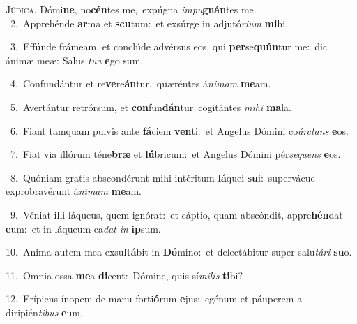 \lettrine{\initial\textcolor{\initialcolor}{J}}{údica,} Dómi\-\textbf{ne}\-, no\-\textbf{cén}\-tes me,~\star expúgna \textit{im}\-\textit{pu}\textbf{gnán}tes me.\\
{\numbfont\textcolor{\numbcolor}{~2.}}~Apprehénde \textbf{ar}\-ma et \textbf{scu}\-tum:~\star et exsúrge in adjutó\-\textit{ri}\-\textit{um} \textbf{mi}\-hi.\par
{\numbfont\textcolor{\numbcolor}{~3.}}~Effúnde frámeam, et conclúde advérsus eos, qui \textbf{per}\-se\-\textbf{quún}\-tur me:~\star dic ánimæ meæ: Salus \textit{tu}\-\textit{a} \textbf{e}\-go sum.\par
{\numbfont\textcolor{\numbcolor}{~4.}}~Confundántur et re\-\textbf{ve}\-re\-\textbf{án}\-tur,~\star quæréntes á\-\textit{ni}\-\textit{mam} \textbf{me}\-am.\par
{\numbfont\textcolor{\numbcolor}{~5.}}~Avertántur retrórsum, et \textbf{con}\-fun\-\textbf{dán}\-tur~\star cogitántes \textit{mi}\-\textit{hi} \textbf{ma}\-la.\par
{\numbfont\textcolor{\numbcolor}{~6.}}~Fiant tamquam pulvis ante \textbf{fá}\-ciem \textbf{ven}\-ti:~\star et Angelus Dómini co\-\textit{árc}\-\textit{tans} \textbf{e}\-os.\par
{\numbfont\textcolor{\numbcolor}{~7.}}~Fiat via illórum téne\textbf{bræ} et \textbf{lú}\-bricum:~\star et Angelus Dómini pér\-\textit{se}\-\textit{quens} \textbf{e}\-os.\par
{\numbfont\textcolor{\numbcolor}{~8.}}~Quóniam gratis abscondérunt mihi intéritum \textbf{lá}\-quei \textbf{su}\-i:~\star supervácue exprobravérunt á\-\textit{ni}\-\textit{mam} \textbf{me}\-am.\par
{\numbfont\textcolor{\numbcolor}{~9.}}~Véniat illi láqueus, quem ignórat:~\dagger et cáptio, quam abscóndit, appre\-\textbf{hén}\-dat \textbf{e}\-um:~\star et in láqueum ca\textit{dat} \textit{in} \textbf{ip}\-sum.\par
{\numbfont\textcolor{\numbcolor}{10.}}~Anima autem mea exsul\-\textbf{tá}\-bit in \textbf{Dó}\-mino:~\star et delectábitur super salu\-\textit{tá}\-\textit{ri} \textbf{su}\-o.\par
{\numbfont\textcolor{\numbcolor}{11.}}~Omnia ossa \textbf{me}\-a \textbf{di}\-cent:~\star Dómine, quis sí\-\textit{mi}\-\textit{lis} \textbf{ti}\-bi?\par
{\numbfont\textcolor{\numbcolor}{12.}}~Erípiens ínopem de manu forti\-\textbf{ó}\-rum \textbf{e}\-jus:~\star egénum et páuperem a diripién\-\textit{ti}\-\textit{bus} \textbf{e}\-um.\par

